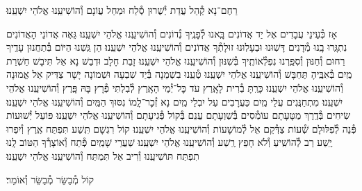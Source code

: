 \documentclass[twoside, openany, parskip=half, 11pt]{book}
\begin{document}
\shatzvkahal
רַחֶם־נָא קְ֯הַל עֲדַת יְ֯שֻׁרוּן סְ֯לַח וּמְחַל עֲוֹנָם וְ֯הוֹשִׁיעֵֽנוּ אֱלֹהֵי יִשְׁעֵֽנוּ׃

\begin{small}
אָז כְּ֯עֵינֵי עֲבָדִים אֶל יַד אֲדוֹנִים בָּֽאנוּ לְ֯פָנֶֽיךָ נְ֯דוֹנִים וְ֯הוֹשִׁיעֵֽנוּ אֱלֹהֵי יִשְׁעֵֽנוּ׃
גֵּאֶה אֲדוֹנֵי הָאֲדוֹנִים נִתְגָּֽרוּ בָֽנוּ מְ֯דָנִים דָּשֽׁוּנוּ וּבְעָלֽוּנוּ זוּלָתְ֯ךָ אֲדוֹנִים וְ֯הוֹשִׁיעֵֽנוּ אֱלֹהֵי יִשְׁעֵֽנוּ׃
הֵן גַּֽשְׁנוּ הַיּוֹם בְּ֯תַחֲנוּן עָדֶֽיךָ רַחוּם וְ֯חַנּוּן וְ֯סִפַּֽרְנוּ נִפְלְ֯אוֹתֶֽיךָ בְּ֯שִׁנּוּן וְ֯הוֹשִׁיעֵֽנוּ אֱלֹהֵי יִשְׁעֵֽנוּ׃
זָבַת חָלָב וּדְבַשׁ נָא אַל תִּיבָשׁ חַשְׁרַת מַֽיִם בְּ֯אִבֶּֽיהָ תֶּחְבָּשׁ וְ֯הוֹשִׁיעֵֽנוּ אֱלֹהֵי יִשְׁעֵֽנוּ׃
טְ֯עֵֽנוּ בִשְׁמֵנָה בְּ֯יַד שִׁבְעָה וּשְׁמוֹנָה יָשָׁר צַדִּיק אֵל אֱמוּנָה וְ֯הוֹשִׁיעֵֽנוּ אֱלֹהֵי יִשְׁעֵֽנוּ׃
כָּרַֽתָּ בְ֯רִית לָאָֽרֶץ עֹד כׇּל־יְ֯מֵי הָאָֽרֶץ לְ֯בִלְתִּי פְ֯רָץ בָּהּ פָּֽרֶץ וְ֯הוֹשִׁיעֵֽנוּ אֱלֹהֵי יִשְׁעֵֽנוּ׃
מִתְחַנֲּנִים עֲלֵי מַֽיִם כַּעֲרָבִים עַל יִבְלֵי מַֽיִם נָא זְ֯כׇר־לָֽמוֹ נִסּוּךְ הַמַּֽיִם וְ֯הוֹשִׁיעֵֽנוּ אֱלֹהֵי יִשְׁעֵֽנוּ׃
שִׂיחִים בְּ֯דֶֽרֶךְ מַטָּעָתָם עוֹמְ֯סִים בְּ֯שַׁוְעָתָם עֲנֵם בְּ֯קוֹל פְּ֯גִיעָתָם וְ֯הוֹשִׁיעֵֽנוּ אֱלֹהֵי יִשְׁעֵֽנוּ׃
פּוֹעֵל יְ֯שׁוּעוֹת פְּ֯נֵה לְ֯פִלּוּלָם שְׁ֯עוֹת צַדְּ֯קֵם אֵל לְ֯מוֹשָׁעוֹת וְ֯הוֹשִׁיעֵֽנוּ אֱלֹהֵי יִשְׁעֵֽנוּ׃
קוֹל רִגְשָׁם תִּֽשַׁע תִּפְתַּח אֶֽרֶץ וְ֯יִפְרוּ יֶֽשַׁע רַב לְ֯הוֹשִֽׁיעַ וְ֯לֹא חָפֵץ רֶֽשַׁע וְ֯הוֹשִׁיעֵֽנוּ אֱלֹהֵי יִשְׁעֵֽנוּ׃
שַׁעֲרֵי שָׁמַֽיִם פְּ֯תַח וְ֯אוֹצָרְ֯ךָ הַטּוֹב לָֽנוּ תִפְתַּח תּוֹשִׁיעֵֽנוּ וְ֯רִיב אַל תִּמְתַּח וְ֯הוֹשִׁיעֵֽנוּ אֱלֹהֵי יִשְׁעֵֽנוּ׃

\end{small}

\begin{large}
קוֹל מְ֯בַשֵּׂר מְ֯בַשֵּׂר וְ֯אוֹמֵר׃

\end{large}
\end{document}
